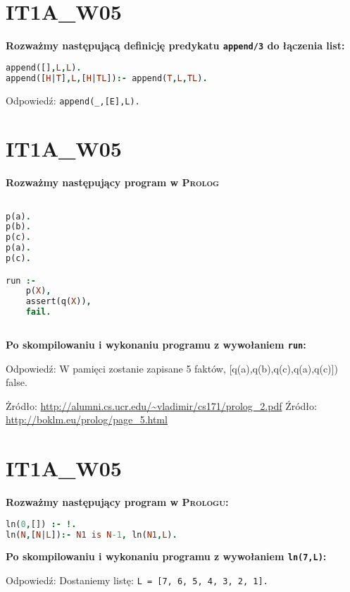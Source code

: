 \section{IT1A\_W05}

\textbf{Rozważmy następującą definicję predykatu \lstinline!append/3! do łączenia list:}
\begin{lstlisting}[language=prolog, frame=trbl]
append([],L,L).
append([H|T],L,[H|TL]):- append(T,L,TL).
\end{lstlisting}

\vspace{0.4cm}
Odpowiedź: \lstinline!append(_,[E],L).!

\section{IT1A\_W05}

\textbf{Rozważmy następujący program w \textsc{Prolog}}
\begin{lstlisting}[language=Prolog, frame=trbl]

p(a).
p(b).
p(c).
p(a).
p(c).

run :- 
	p(X),
	assert(q(X)),
	fail.
	
\end{lstlisting}
\textbf{Po skompilowaniu i wykonaniu programu z wywołaniem \lstinline!run!:}
\vspace{0.4cm}

Odpowiedź: \newline
W pamięci zostanie zapisane 5 faktów, [q(a),q(b),q(c),q(a),q(c)])
false.

\vspace{0.4cm}
Żródło: \url{http://alumni.cs.ucr.edu/~vladimir/cs171/prolog_2.pdf} \newline
Źródło: \url{http://boklm.eu/prolog/page_5.html} \newline


\section{IT1A\_W05}

\textbf{Rozważmy następujący program w \textsc{Prologu}:}
\begin{lstlisting}[language=prolog, frame=trbl]
ln(0,[]) :- !.
ln(N,[N|L]):- N1 is N-1, ln(N1,L).
\end{lstlisting}
\textbf{Po skompilowaniu i wykonaniu programu z wywołaniem \lstinline!ln(7,L)!:}

\vspace{0.4cm}
Odpowiedź:\newline
Dostaniemy listę: \lstinline!L = [7, 6, 5, 4, 3, 2, 1].!


